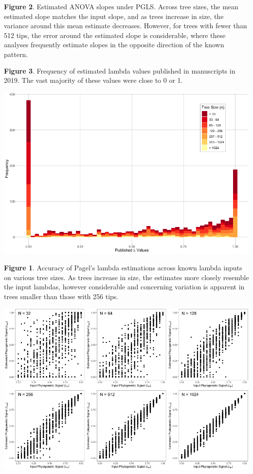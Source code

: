 \documentclass[]{article}
\begin{document}
\textbf{Figure 2}. Estimated ANOVA slopes under PGLS. Across tree sizes,
the mean estimated slope matches the input slope, and as trees increase
in size, the variance around this mean estimate decreases. However, for
trees with fewer than 512 tips, the error around the estimated slope is
considerable, where these analyses frequently estimate slopes in the
opposite direction of the known pattern.

\textbf{Figure 3}. Frequency of estimated lambda values published in
manuscripts in 2019. The vast majority of these values were close to 0
or 1.

\newpage

\includegraphics[width=0.95\linewidth]{Fig1}

\singlespacing \textbf{Figure 1}. Accuracy of Pagel's lambda estimations
across known lambda inputs on various tree sizes. As trees increase in
size, the estimates more closely resemble the input lambdas, however
considerable and concerning variation is apparent in trees smaller than
those with 256 tips. \hfill\break

\newpage

\includegraphics[width=0.95\linewidth]{Fig2}
\end{document}
